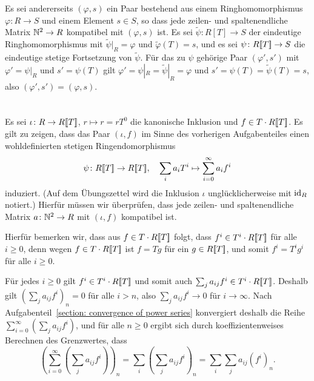 \documentclass[a4paper, 10pt, numbers=noenddot]{scrartcl}
\begin{document}
Es sei andererseits $(\varphi, s)$ ein Paar bestehend aus einem Ringhomomorphismus $\varphi \colon R \to S$ und einem Element $s \in S$, so dass jede zeilen- und spaltenendliche Matrix $\mathbb{N}^2 \to R$ kompatibel mit $(\varphi, s)$ ist.
Es sei $\tilde{\psi} \colon R[T] \to S$ der eindeutige Ringhomomorphismus mit $\tilde{\psi}|_R = \varphi$ und $\tilde{\varphi}(T) = s$, und es sei $\psi \colon R[\![T]\!] \to S$ die eindeutige stetige Fortsetzung von $\tilde{\psi}$.
Für das zu $\psi$ gehörige Paar $(\varphi', s')$ mit $\varphi' = \psi|_R$ und $s' = \psi(T)$ gilt $\varphi' = \psi|_R = \tilde{\psi}|_R = \varphi$ und $s' = \psi(T) = \tilde{\psi}(T) = s$, also $(\varphi', s') = (\varphi, s)$.





\section{}

Es sei $\iota \colon R \to R[\![T]\!]$, $r \mapsto r = r T^0$ die kanonische Inklusion und $f \in T \cdot R[\![T]\!]$.
Es gilt zu zeigen, dass das Paar $(\iota, f)$ im Sinne des vorherigen Aufgabenteiles einen wohldefinierten stetigen Ringendomorphismus
\[
  \psi \colon R[\![T]\!] \to R[\![T]\!],
  \quad
  \sum_i a_i T^i \mapsto \sum_{i=0}^\infty a_i f^i
\]
induziert.
(Auf dem Übungszettel wird die Inklusion $\iota$ unglücklicherweise mit $\operatorname{id}_R$ notiert.)
Hierfür müssen wir überprüfen, dass jede zeilen- und spaltenendliche Matrix $a \colon \mathbb{N}^2 \to R$ mit $(\iota, f)$ kompatibel ist.

Hierfür bemerken wir, dass aus $f \in T \cdot R[\![T]\!]$ folgt, dass $f^i \in T^i \cdot R[\![T]\!]$ für alle $i \geq 0$, denn wegen $f \in T \cdot R[\![T]\!]$ ist $f = T g$ für ein $g \in R[\![T]\!]$, und somit $f^i = T^i g^i$ für alle $i \geq 0$.

Für jedes $i \geq 0$ gilt $f^i \in T^i \cdot R[\![T]\!]$ und somit auch $\sum_j a_{ij} f^i \in T^i \cdot R[\![T]\!]$.
Deshalb gilt $(\sum_j a_{ij} f^i)_n = 0$ für alle $i > n$, also $\sum_j a_{ij} f^i \to 0$ für $i \to \infty$.
Nach Aufgabenteil~\ref{section: convergence of power series} konvergiert deshalb die Reihe $\sum_{i=0}^\infty (\sum_j a_{ij} f^i)$, und für alle $n \geq 0$ ergibt sich durch koeffizientenweises Berechnen des Grenzwertes, dass
\[
    \left( \sum_{i=0}^\infty \left( \sum_j a_{ij} f^i \right) \right)_{\!\!\!n}
  = \sum_i \left( \sum_j a_{ij} f^i \right)_{\!\!\!n}
  = \sum_i \sum_j a_{ij} (f^i)_n.
\]
\end{document}
